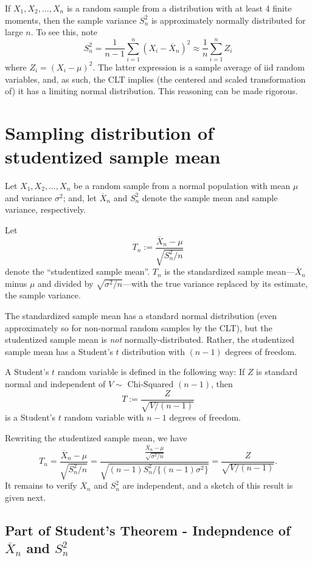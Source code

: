 \documentclass[
]{book}
\begin{document}
If \(X_1, X_2, \ldots, X_n\) is a random sample from a distribution with at least 4 finite moments, then the sample variance \(S_n^2\) is approximately normally distributed for large \(n\). To see this, note
\[S_n^2 = \frac{1}{n-1}\sum_{i=1}^n (X_i - \overline X_n)^2 \approx \frac{1}{n}\sum_{i=1}^n Z_i\]
where \(Z_i = (X_i - \mu)^2\). The latter expression is a sample average of iid random variables, and, as such, the CLT implies (the centered and scaled transformation of) it has a limiting normal distribution. This reasoning can be made rigorous.

\hypertarget{sampling-distribution-of-studentized-sample-mean}{%
\section{Sampling distribution of studentized sample mean}\label{sampling-distribution-of-studentized-sample-mean}}

Let \(X_1, X_2, \ldots, X_n\) be a random sample from a normal population with mean \(\mu\) and variance \(\sigma^2\); and, let \(\overline X_n\) and \(S_n^2\) denote the sample mean and sample variance, respectively.

Let
\[T_n:=\frac{\overline X_n - \mu}{\sqrt{S_n^2 / n}}\]
denote the ``studentized sample mean''. \(T_n\) is the standardized sample mean---\(\overline X_n\) minus \(\mu\) and divided by \(\sqrt{\sigma^2/n}\)---with the true variance replaced by its estimate, the sample variance.

The standardized sample mean has a standard normal distribution (even approximately so for non-normal random samples by the CLT), but the studentized sample mean is \emph{not} normally-distributed. Rather, the studentized sample mean has a Student's \(t\) distribution with \((n-1)\) degrees of freedom.

A Student's \(t\) random variable is defined in the following way: If \(Z\) is standard normal and independent of \(V \sim\) Chi-Squared \((n-1)\), then
\[T:=\frac{Z}{\sqrt{V/(n-1)}}\]
is a Student's \(t\) random variable with \(n-1\) degrees of freedom.

Rewriting the studentized sample mean, we have
\[T_n = \frac{\overline X_n - \mu}{\sqrt{S_n^2 / n}} = \frac{\frac{\overline X_n - \mu}{\sqrt{\sigma^2 / n}}}{\sqrt{(n-1)S_n^2/\{(n-1)\sigma^2\}}} = \frac{Z}{\sqrt{V/(n-1)}}.\]
It remains to verify \(\overline X_n\) and \(S_n^2\) are independent, and a sketch of this result is given next.

\hypertarget{part-of-students-theorem---indepndence-of-overline-x_n-and-s_n2}{%
\subsection{\texorpdfstring{Part of Student's Theorem - Indepndence of \(\overline X_n\) and \(S_n^2\)}{Part of Student's Theorem - Indepndence of \textbackslash overline X\_n and S\_n\^{}2}}\label{part-of-students-theorem---indepndence-of-overline-x_n-and-s_n2}}
\end{document}
